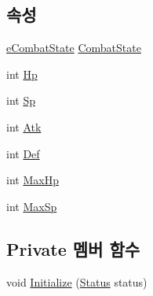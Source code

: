 \subsection*{속성}
\begin{DoxyCompactItemize}
\item 
\hyperlink{_unit_object_8cs_ae6d9f4a8ae9fffcdf1a546168a44f917}{e\+Combat\+State} \hyperlink{class_combat_instance_a149d2068f3dc0ec72f3461d101dcebab}{Combat\+State}
\item 
int \hyperlink{class_combat_instance_ae4682b727ea05a59141f747341877eb6}{Hp}
\item 
int \hyperlink{class_combat_instance_a120995296719b1fb1fa4cc55721ddba4}{Sp}
\item 
int \hyperlink{class_combat_instance_a9de7c50888b56d9854709d132e69baa9}{Atk}
\item 
int \hyperlink{class_combat_instance_ab52acfd86a70be3647d2f092e6816190}{Def}
\item 
int \hyperlink{class_combat_instance_a33c5218456253d1a5c457fe6364b10d7}{Max\+Hp}
\item 
int \hyperlink{class_combat_instance_ad1d6d4d72223021bd0130b069437463d}{Max\+Sp}
\end{DoxyCompactItemize}
\subsection*{Private 멤버 함수}
\begin{DoxyCompactItemize}
\item 
void \hyperlink{class_combat_instance_a2b1d21b8c8afbcf8ba1782ce65c01da4}{Initialize} (\hyperlink{struct_status}{Status} status)
\end{DoxyCompactItemize}
